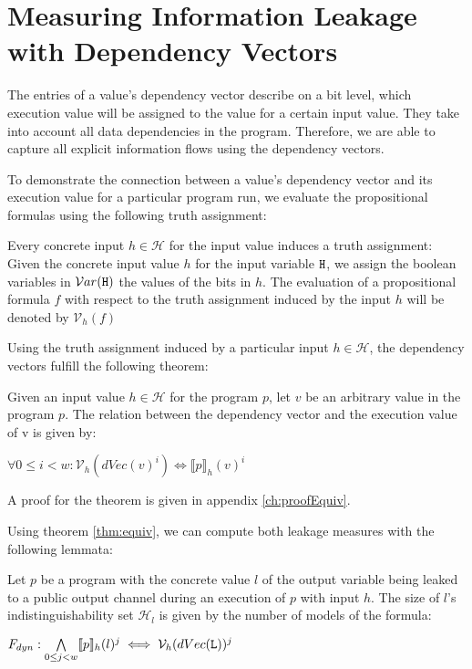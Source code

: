 \section{Measuring Information Leakage with Dependency Vectors}\label{sec:leak}

The entries of a value's dependency vector describe on a bit level, which execution value will be assigned to the value for a certain input value. They take into account all data dependencies in the program. Therefore, we are able to capture all explicit information flows using the dependency vectors.

To demonstrate the connection between a value's dependency vector and its execution value for a particular program run, we evaluate the propositional formulas using the following truth assignment:

\begin{definition}\label{def:val}
    Every concrete input $h \in \mathcal{H}$ for the input value \In induces a truth assignment: Given the concrete input value $h$ for the input variable $\mathtt{H}$, we assign the boolean variables in $\mathcal{V}ar(\mathtt{H})$ the values of the bits in $h$.
    The evaluation of a propositional formula $f$ with respect to the truth assignment induced by the input $h$ will be denoted by $\mathcal{V}_h (f)$
\end{definition}

Using the truth assignment induced by a particular input $h \in \mathcal{H}$, the dependency vectors fulfill the following theorem:

\begin{theorem}\label{thm:equiv}
    Given an input value $h \in \mathcal{H}$ for the program $p$, let $v$ be an arbitrary value in the program $p$. The relation between the dependency vector and the execution value of v is given by:
    \begin{center}
        $\forall 0 \leq i < w: \mathcal{V}_h(dVec(v)^i) \iff \llbracket p \rrbracket_h (v)^i$
    \end{center}
    A proof for the theorem is given in appendix \ref{ch:proofEquiv}.
\end{theorem}

Using theorem \ref{thm:equiv}, we can compute both leakage measures with the following lemmata:

\begin{lemma}
    Let $p$ be a program with the concrete value $l$ of the output variable \Out being leaked to a public output channel during an execution of $p$ with input $h$.
    The size of $l$'s indistinguishability set $\mathcal{H}_l$ is given by the number of models of the formula:
    \begin{center}
        $F_{dyn} : \bigwedge\limits_{0 \leq j < w} \llbracket p \rrbracket_h(l)^j \iff \mathcal{V}_h(dVec(\mathtt{L}))^j$
    \end{center}
\end{lemma}

